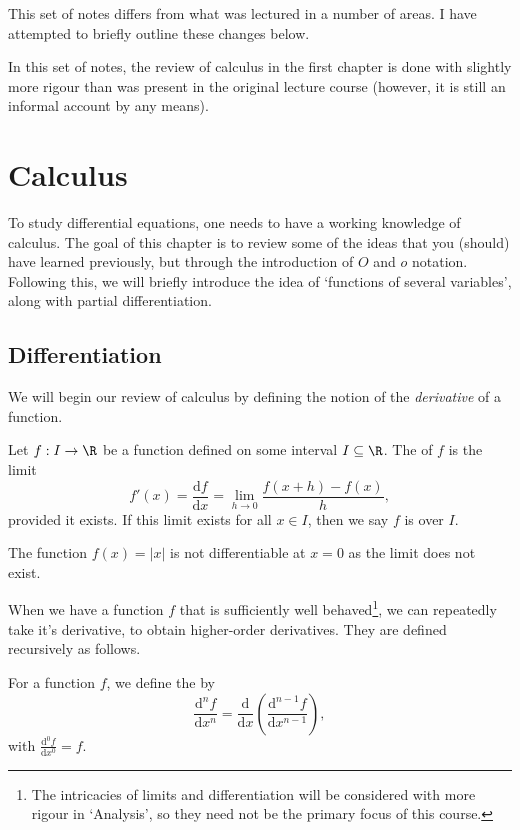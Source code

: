 \documentclass[a4paper]{scrreprt}
\newcommand{\dd}{\mathrm{d}}
\begin{document}
This set of notes differs from what was lectured in a number of areas. I have attempted to briefly outline these changes below.

In this set of notes, the review of calculus in the first chapter is done with slightly more rigour than was present in the original lecture course (however, it is still an informal account by any means).


\clearpage


\chapter{Calculus}

To study differential equations, one needs to have a working knowledge of calculus. The goal of this chapter is to review some of the ideas that you (should) have learned previously, but through the introduction of $O$ and $o$ notation. Following this, we will briefly introduce the idea of `functions of several variables', along with partial differentiation.


\section{Differentiation}

We will begin our review of calculus by defining the notion of the \emph{derivative} of a function. 

\begin{definition}[Derivative]
	Let $f: I \rightarrow \R$ be a function defined on some interval $I \subseteq \R$. The  of $f$ 
	is the limit
	$$
	f'(x) = \frac{\dd f}{\dd x} = \lim_{h \to 0} \frac{f(x + h) - f(x)}{h},
	$$
	provided it exists.
	If this limit exists for all $x \in I$, then we say $f$ is  over $I$. 
\end{definition}

\begin{example}
	The function $f(x) = |x|$ is not differentiable at $x = 0$ as the limit does not exist. 
\end{example}


When we have a function $f$ that is sufficiently well behaved\footnote{The intricacies of limits and differentiation will be considered with more rigour in `Analysis', so they need not be the primary focus of this course.}, we can repeatedly take it's derivative, to obtain higher-order derivatives. They are defined recursively as follows.

\begin{definition}
	For a function $f$, we define the  by
	$$
	\frac{\dd^n f}{\dd x^n} = \frac{\dd}{\dd x} \left(
		\frac{\dd^{n- 1} f}{\dd x^{n-1}}
	\right),
	$$
	with $\frac{\dd^0 f}{\dd x^0} = f$.
\end{definition}
\end{document}
